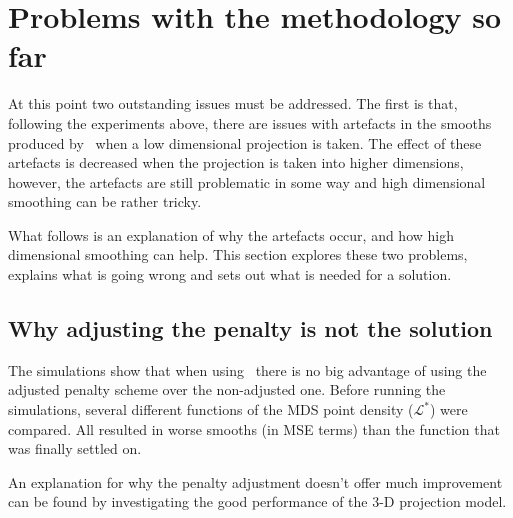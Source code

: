 {%
%
%
%
%
%
%

\section{Problems with the methodology so far}
\label{mds-problems}

At this point two outstanding issues must be addressed. The first is that, following the experiments above, there are issues with artefacts in the smooths produced by \mdsap\ when a low dimensional projection is taken. The effect of these artefacts is decreased when the projection is taken into higher dimensions, however, the artefacts are still problematic in some way and high dimensional smoothing can be rather tricky. 

What follows is an explanation of why the artefacts occur, and how high dimensional smoothing can help. This section explores these two problems, explains what is going wrong and sets out what is needed for a solution.

\subsection{Why adjusting the penalty is not the solution}
\label{pensuck}

The simulations show that when using \mdsap\ there is no big advantage of using the adjusted penalty scheme over the non-adjusted one. Before running the simulations, several different functions of the MDS point density ($\mathcal{L}^*$) were compared. All resulted in worse smooths (in MSE terms) than the function that was finally settled on.

An explanation for why the penalty adjustment doesn't offer much improvement can be found by investigating the good performance of the 3-D projection model. 

}
